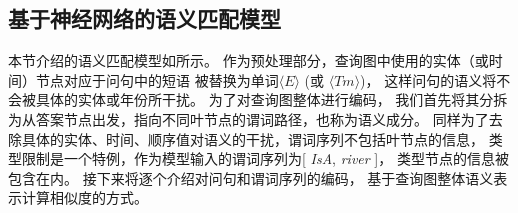 
\subsection{基于神经网络的语义匹配模型}
\label{sec:compqa-nn}



本节介绍的语义匹配模型如所示。
作为预处理部分，查询图中使用的实体（或时间）节点对应于问句中的短语
被替换为单词$\langle E \rangle$ (或 $\langle Tm \rangle$)，
这样问句的语义将不会被具体的实体或年份所干扰。
为了对查询图整体进行编码，
我们首先将其分拆为从答案节点出发，指向不同叶节点的谓词路径，也称为语义成分。
同样为了去除具体的实体、时间、顺序值对语义的干扰，谓词序列不包括叶节点的信息，
类型限制是一个特例，作为模型输入的谓词序列为[ \textit{IsA}, \textit{river} ]，
类型节点的信息被包含在内。
接下来将逐个介绍对问句和谓词序列的编码，
基于查询图整体语义表示计算相似度的方式。




